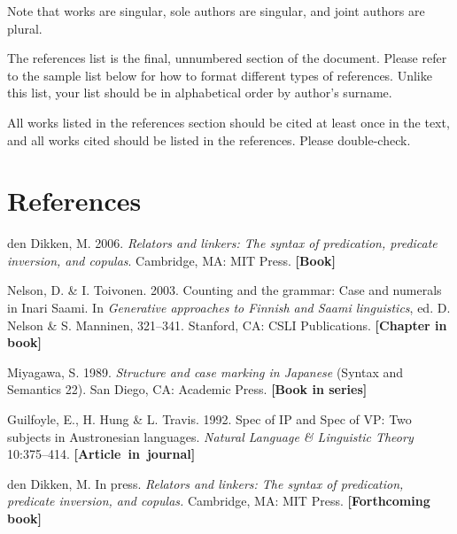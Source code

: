 \documentclass[letterpaper,12pt, twoside]{article}
\begin{document}
{Note that works are singular, sole authors are singular, and joint authors are plural.

The references list is the final, unnumbered section of the document. Please refer to the sample list below for how to format different types of references. Unlike this list, your list should be in alphabetical order by author's surname. 

All works listed in the references section should be cited at least once in the text, and all works cited should be listed in the references. Please double-check. 





\section*{References}
\begin{list}{}{\leftmargin  0.25in
               \itemindent -0.25in \itemsep 0pt \parsep 0pt }

\item
den Dikken, M. 2006. \emph{Relators and linkers: The syntax of predication, predicate inversion, and copulas}. Cambridge, MA: MIT Press. {\footnotesize\bfseries \hfill [Book]}

\item Nelson, D. \& I. Toivonen. 2003. Counting and the grammar: Case and numerals in
Inari Saami. In \emph{Generative approaches to Finnish
and Saami linguistics}, ed. D. Nelson \& S. Manninen, 321--341. Stanford, CA: CSLI Publications.
{\footnotesize\bfseries \hfill [Chapter in book]}

\item
Miyagawa, S. 1989. \emph{Structure and case marking in Japanese} (Syntax and Semantics 22). San Diego, CA: Academic Press. {\footnotesize\bfseries \hfill [Book in series]}

\item
Guilfoyle, E., H. Hung \& L. Travis. 1992. Spec of IP and Spec of VP: Two subjects in Austronesian languages. \emph{Natural Language \& Linguistic Theory} 10:375--414. {\footnotesize\bfseries  \hfill \hbox{[Article in journal]}}

\item
den Dikken, M. In press. \emph{Relators and linkers: The syntax of predication, predicate inversion, and copulas.} Cambridge, MA: MIT Press.  {\footnotesize\bfseries \hfill [Forthcoming book]}


\end{list}}
\end{document}
